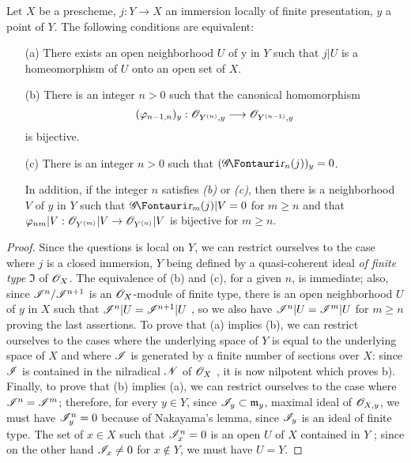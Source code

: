 \begin{proposition}[16.1.9]
\label{IV.16.1.9}
Let $X$ be a prescheme, $j: Y \to X$ an immersion locally of finite presentation, $y$ a point of $Y$. The following conditions are equivalent:
\begin{enumerate}
  \item[(a)] There exists an open neighborhood $U$ of y in $Y$ such that $j|U$ is a homeomorphism of $U$ onto an open set of $X$.
  \item[(b)] There is an integer $n>0$ such that the canonical homomorphism
  \[
    (\varphi_{n-1,n})_y: \sh{O}_{Y^{(n)},y} \to \sh{O}_{Y^{(n-1)},y}
  \]
  is bijective.
  \item[(c)] There is an integer $n>0$ such that $(\shGr_n(j))_y = 0$.
  
  In addition, if the integer $n$ satisfies \emph{(b)} or \emph{(c)}, then there is a neighborhood $V$ of $y$ in $Y$ such that $\shGr_m(j)|V = 0$ for $m \geq n$ and that $\varphi_{nm}|V: \sh{O}_{Y^{(m)}}|V \to \sh{O}_{Y^{(n)}}|V$ is bijective for $m \geq n$. 
\end{enumerate}
\end{proposition}

\begin{proof}
Since the questions is local on $Y$, we can restrict ourselves to the case where $j$ is a closed immersion, $Y$ being defined by a quasi-coherent ideal \emph{of finite type} $\mathfrak{I}$ of $\mathscr{O}_X$.
The equivalence of (b) and (c), for a given $n$, is immediate;
also, since $\mathscr{I}^n/\mathscr{I}^{n+1}$ is an $\mathscr{O}_X$-module of finite type, there is an open neighborhood $U$ of $y$ in $X$ such that $\mathscr{I}^n|U = \mathscr{I}^{n+1}|U$ , so we also have $\mathscr{I}^n|U = \mathscr{I}^m|U$ for $m \geq n$ proving the last assertions.
To prove that (a) implies (b), we can restrict ourselves to the cases where the underlying space of $Y$ is equal to the underlying space of $X$ and where $\mathscr{I}$ is generated by a finite number of sections over $X$:
since $\mathscr{I}$ is contained in the nilradical $\mathscr{N}$ of $\mathscr{O}_X$ , it is now nilpotent which proves b).
Finally, to prove that (b) implies (a), we can restrict ourselves to the case where $\mathscr{I}^n = \mathscr{I}^m$; 
therefore, for every $y \in Y$, since $\mathscr{I}_y \subset \mathfrak{m}_y$, maximal ideal of $\mathscr{O}_{X,y}$, we must have $\mathscr{I}^n_y = 0$ because of Nakayama's lemma, since $\mathscr{I}_y$ is an ideal of finite type.
The set of $x \in X$ such that $\mathscr{I}^n_x = 0$ is an open $U$ of $X$ contained in $Y$ ;
since on the other hand $\mathscr{I}_x \neq 0$ for $x \notin Y$, we must have $U = Y$.
\end{proof}

